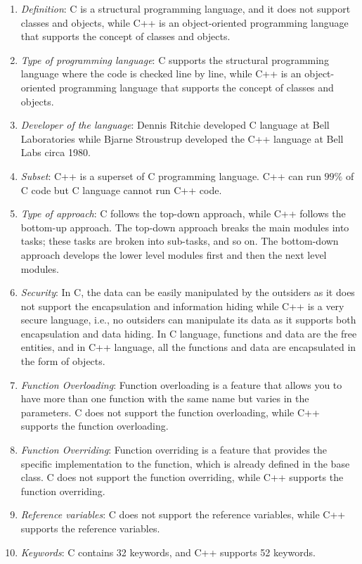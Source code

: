 \documentclass{book}
\begin{document}
\begin{enumerate}
	\item \textit{Definition}: C is a structural programming language, and it does not support classes and objects, while C++ is an object-oriented programming language that supports the concept of classes and objects.
\item \textit{Type of programming language}: C supports the structural programming language where the code is checked line by line, while C++ is an object-oriented programming language that supports the concept of classes and objects.
\item \textit{Developer of the language}: Dennis Ritchie developed C language at Bell Laboratories while Bjarne Stroustrup developed the C++ language at Bell Labs circa 1980.
\item \textit{Subset}: C++ is a superset of C programming language. C++ can run $99\%$ of C code but C language cannot run C++ code.
\item \textit{Type of approach}: C follows the top-down approach, while C++ follows the bottom-up approach. The top-down approach breaks the main modules into tasks; these tasks are broken into sub-tasks, and so on. The bottom-down approach develops the lower level modules first and then the next level modules.
\item \textit{Security}: In C, the data can be easily manipulated by the outsiders as it does not support the encapsulation and information hiding while C++ is a very secure language, i.e., no outsiders can manipulate its data as it supports both encapsulation and data hiding. In C language, functions and data are the free entities, and in C++ language, all the functions and data are encapsulated in the form of objects.
\item \textit{Function Overloading}: Function overloading is a feature that allows you to have more than one function with the same name but varies in the parameters. C does not support the function overloading, while C++ supports the function overloading.
\item \textit{Function Overriding}: Function overriding is a feature that provides the specific implementation to the function, which is already defined in the base class. C does not support the function overriding, while C++ supports the function overriding.
\item \textit{Reference variables}: C does not support the reference variables, while C++ supports the reference variables.
\item \textit{Keywords}: C contains 32 keywords, and C++ supports 52 keywords.

\end{enumerate}
\end{document}
